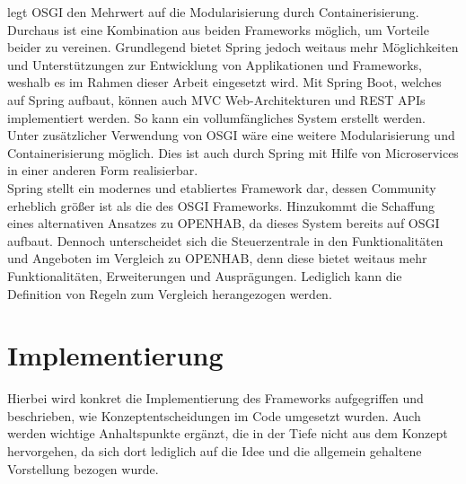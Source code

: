         legt \acs{OSGI} den Mehrwert auf die Modularisierung durch Containerisierung. Durchaus ist eine Kombination aus beiden 
        Frameworks möglich, um Vorteile beider zu vereinen. Grundlegend bietet Spring jedoch weitaus mehr Möglichkeiten und Unterstützungen 
        zur Entwicklung von Applikationen und Frameworks, weshalb es im Rahmen dieser Arbeit eingesetzt wird. Mit Spring Boot, welches auf Spring 
        aufbaut, können auch \acl{MVC} Web-Architekturen und \acs{REST} \acs{API}s implementiert werden. So kann 
        ein vollumfängliches System erstellt werden. Unter zusätzlicher Verwendung von \acs{OSGI} wäre eine weitere Modularisierung und Containerisierung möglich. Dies 
        ist auch durch Spring mit Hilfe von Microservices in einer anderen Form realisierbar. 
        \\
        \linebreak
        Spring stellt ein modernes und etabliertes Framework dar, dessen Community erheblich größer ist als die des \acs{OSGI} Frameworks. 
        Hinzukommt die Schaffung eines alternativen Ansatzes zu \acs{OPENHAB}, da dieses System bereits 
        auf \acs{OSGI} aufbaut. 
        Dennoch unterscheidet sich die Steuerzentrale in den Funktionalitäten und Angeboten im Vergleich zu \acs{OPENHAB}, denn diese bietet weitaus mehr 
        Funktionalitäten, Erweiterungen und Ausprägungen. Lediglich kann die Definition von Regeln zum Vergleich herangezogen werden. 

\section{Implementierung}
\label{sec:implementation}
    Hierbei wird konkret die Implementierung des Frameworks aufgegriffen und beschrieben, wie Konzeptentscheidungen im Code umgesetzt wurden. 
    Auch werden wichtige Anhaltspunkte ergänzt, die in der Tiefe nicht aus dem Konzept hervorgehen, da sich dort lediglich auf die Idee und die allgemein gehaltene 
    Vorstellung bezogen wurde. 

